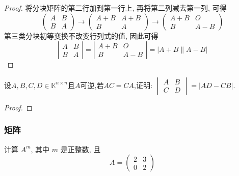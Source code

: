 \begin{proof}
    将分块矩阵的第二行加到第一行上, 再将第二列减去第一列, 可得
$$
\left(\begin{array}{cc}
A & B \\
B & A
\end{array}\right) \rightarrow\left(\begin{array}{cc}
A+B & A+B \\
B & A
\end{array}\right) \rightarrow\left(\begin{array}{cc}
A+B & O \\
B & A-B
\end{array}\right)
$$
第三类分块初等变换不改变行列式的值, 因此可得
$$
\left|\begin{array}{ll}
A & B \\
B & A
\end{array}\right|=\left|\begin{array}{cc}
A+B & O \\
B & A-B
\end{array}\right|=|A+B \| A-B|
$$
\end{proof}

\begin{problem}
    设$A,B,C,D \in \mathbb{K}^{n \times n}$且$A$可逆,若$AC=CA$,证明:
    $\begin{vmatrix}
        A &B\\C &D
    \end{vmatrix}=|AD-CB|.$
\end{problem}

\begin{proof}
    
\end{proof}

\subsubsection{矩阵}

\begin{problem}
    计算 $A^m$, 其中 $m$ 是正整数, 且
\[
A=\left(\begin{array}{ll}
2 & 3 \\
0 & 2
\end{array}\right)
\]
\end{problem}

